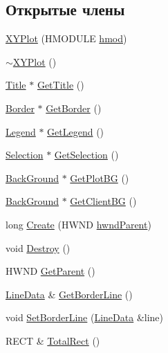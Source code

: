 \subsection*{Открытые члены}
\begin{DoxyCompactItemize}
\item 
\hyperlink{class_x_y_plot_a2d0d8e66781c3f0a5ad5d9100596cda4}{X\-Y\-Plot} (H\-M\-O\-D\-U\-L\-E \hyperlink{class_x_y_plot_ab15afb29a18084d99ed04dc3a7485326}{hmod})
\item 
\hyperlink{class_x_y_plot_a9ce0f0c94d8a3e63fec0182eca1c188e}{$\sim$\-X\-Y\-Plot} ()
\item 
\hyperlink{class_title}{Title} $\ast$ \hyperlink{class_x_y_plot_a03e53585fb5afcb93247dccd1b19b56b}{Get\-Title} ()
\item 
\hyperlink{class_border}{Border} $\ast$ \hyperlink{class_x_y_plot_ade2176696dd10597cd6f2212c18eceb6}{Get\-Border} ()
\item 
\hyperlink{class_legend}{Legend} $\ast$ \hyperlink{class_x_y_plot_ae000f33613c3b3a35f6321a9c896b977}{Get\-Legend} ()
\item 
\hyperlink{class_selection}{Selection} $\ast$ \hyperlink{class_x_y_plot_a7ff273d7ad3b6f42a91210b80b565b3a}{Get\-Selection} ()
\item 
\hyperlink{class_back_ground}{Back\-Ground} $\ast$ \hyperlink{class_x_y_plot_a16f6b1b55d13ccd2b0ab131a34c1af96}{Get\-Plot\-B\-G} ()
\item 
\hyperlink{class_back_ground}{Back\-Ground} $\ast$ \hyperlink{class_x_y_plot_a2713f1deb1b4307c3a8b879a9fd8af17}{Get\-Client\-B\-G} ()
\item 
long \hyperlink{class_x_y_plot_a1766811e5ee992a9de2047d82cc1e64a}{Create} (H\-W\-N\-D \hyperlink{class_x_y_plot_a8421da7d70fcc3b4a6844cf9cdbeeff6}{hwnd\-Parent})
\item 
void \hyperlink{class_x_y_plot_a3003d92dc845da459b6a714b747c51ae}{Destroy} ()
\item 
H\-W\-N\-D \hyperlink{class_x_y_plot_abdbb5fbe242d1be3ae522cc8f1b77a8a}{Get\-Parent} ()
\item 
\hyperlink{class_line_data}{Line\-Data} \& \hyperlink{class_x_y_plot_ae0ed64b7cb3068e727054ca432f528cb}{Get\-Border\-Line} ()
\item 
void \hyperlink{class_x_y_plot_a94d0b78106b7377d9b93c3e95e541db2}{Set\-Border\-Line} (\hyperlink{class_line_data}{Line\-Data} \&line)
\item 
R\-E\-C\-T \& \hyperlink{class_x_y_plot_a43621e70ff7f53dfb56c36886ac170b0}{Total\-Rect} ()
\item 

\end{DoxyCompactItemize}
